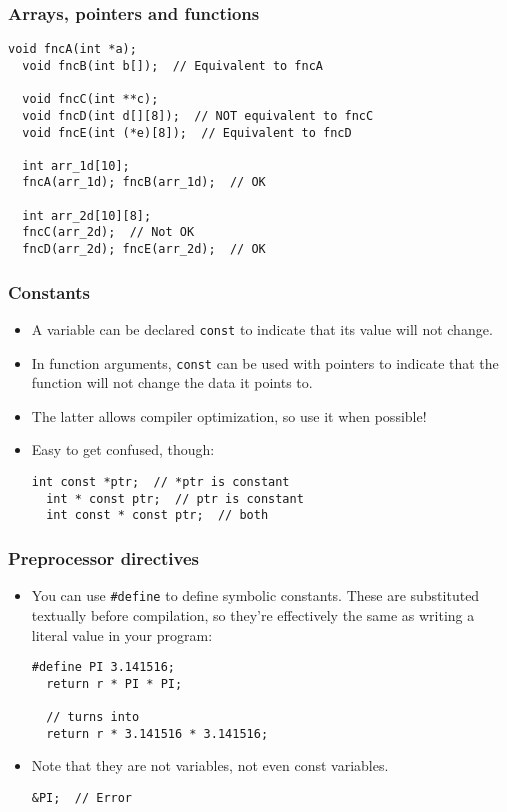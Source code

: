 \begin{frame}[fragile]
  \frametitle{Arrays, pointers and functions}
  \begin{lstlisting}[style=c]
  void fncA(int *a);
  void fncB(int b[]);  // Equivalent to fncA

  void fncC(int **c);
  void fncD(int d[][8]);  // NOT equivalent to fncC
  void fncE(int (*e)[8]);  // Equivalent to fncD

  int arr_1d[10];
  fncA(arr_1d); fncB(arr_1d);  // OK

  int arr_2d[10][8];
  fncC(arr_2d);  // Not OK
  fncD(arr_2d); fncE(arr_2d);  // OK
  \end{lstlisting}
\end{frame}

\begin{frame}[fragile]
  \frametitle{Constants}
  \begin{itemize}
  \item A variable can be declared \texttt{const} to indicate that its value
    will not change.
  \item In function arguments, \texttt{const} can be used with pointers to
    indicate that the function will not change the data it points to.
  \item The latter allows compiler optimization, so use it when possible!
  \item Easy to get confused, though:
    \begin{lstlisting}[style=c]
  int const *ptr;  // *ptr is constant
  int * const ptr;  // ptr is constant
  int const * const ptr;  // both
    \end{lstlisting}
  \end{itemize}
\end{frame}

\begin{frame}[fragile]
  \frametitle{Preprocessor directives}
  \begin{itemize}
  \item You can use \texttt{\#define} to define symbolic constants. These are
    substituted textually before compilation, so they're effectively the same as
    writing a literal value in your program:
    \begin{lstlisting}[style=c]
  #define PI 3.141516;
  return r * PI * PI;

  // turns into
  return r * 3.141516 * 3.141516;
    \end{lstlisting}
  \item Note that they are not variables, not even const variables.
    \begin{lstlisting}[style=c]
  &PI;  // Error
    \end{lstlisting}
  \end{itemize}
\end{frame}

